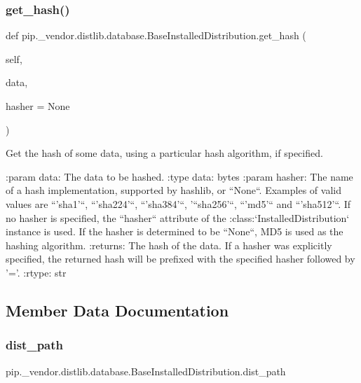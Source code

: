 \subsubsection{\texorpdfstring{get\+\_\+hash()}{get\_hash()}}
{\footnotesize\ttfamily def pip.\+\_\+vendor.\+distlib.\+database.\+Base\+Installed\+Distribution.\+get\+\_\+hash (\begin{DoxyParamCaption}\item[{}]{self,  }\item[{}]{data,  }\item[{}]{hasher = {\ttfamily None} }\end{DoxyParamCaption})}

\begin{DoxyVerb}Get the hash of some data, using a particular hash algorithm, if
specified.

:param data: The data to be hashed.
:type data: bytes
:param hasher: The name of a hash implementation, supported by hashlib,
       or ``None``. Examples of valid values are ``'sha1'``,
       ``'sha224'``, ``'sha384'``, '``sha256'``, ``'md5'`` and
       ``'sha512'``. If no hasher is specified, the ``hasher``
       attribute of the :class:`InstalledDistribution` instance
       is used. If the hasher is determined to be ``None``, MD5
       is used as the hashing algorithm.
:returns: The hash of the data. If a hasher was explicitly specified,
  the returned hash will be prefixed with the specified hasher
  followed by '='.
:rtype: str
\end{DoxyVerb}
 

\subsection{Member Data Documentation}
\mbox{\label{classpip_1_1__vendor_1_1distlib_1_1database_1_1BaseInstalledDistribution_ab17d173eea8811a1ccdb286de7cf6ff7}} 
\subsubsection{\texorpdfstring{dist\+\_\+path}{dist\_path}}
{\footnotesize\ttfamily pip.\+\_\+vendor.\+distlib.\+database.\+Base\+Installed\+Distribution.\+dist\+\_\+path}

